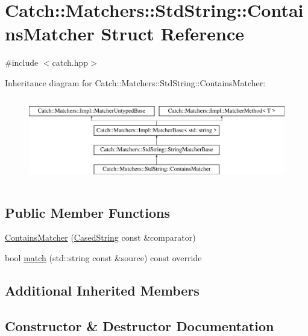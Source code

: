 \hypertarget{struct_catch_1_1_matchers_1_1_std_string_1_1_contains_matcher}{}\section{Catch\+::Matchers\+::Std\+String\+::Contains\+Matcher Struct Reference}
\label{struct_catch_1_1_matchers_1_1_std_string_1_1_contains_matcher}


{\ttfamily \#include $<$catch.\+hpp$>$}

Inheritance diagram for Catch\+::Matchers\+::Std\+String\+::Contains\+Matcher\+:\begin{figure}[H]
\begin{center}
\leavevmode
\includegraphics[height=3.758389cm]{struct_catch_1_1_matchers_1_1_std_string_1_1_contains_matcher}
\end{center}
\end{figure}
\subsection*{Public Member Functions}
\begin{DoxyCompactItemize}
\item 
\mbox{\hyperlink{struct_catch_1_1_matchers_1_1_std_string_1_1_contains_matcher_acc892883c8409e34b28c9b39d4ef1fe3}{Contains\+Matcher}} (\mbox{\hyperlink{struct_catch_1_1_matchers_1_1_std_string_1_1_cased_string}{Cased\+String}} const \&comparator)
\item 
bool \mbox{\hyperlink{struct_catch_1_1_matchers_1_1_std_string_1_1_contains_matcher_a630628b234b037be83fe587081a80b53}{match}} (std\+::string const \&source) const override
\end{DoxyCompactItemize}
\subsection*{Additional Inherited Members}


\subsection{Constructor \& Destructor Documentation}
\mbox{\label{struct_catch_1_1_matchers_1_1_std_string_1_1_contains_matcher_acc892883c8409e34b28c9b39d4ef1fe3}} 
